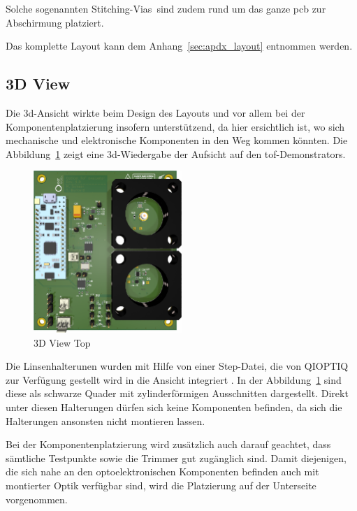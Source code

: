 Solche sogenannten \dq Stitching-Vias\dq\ sind zudem rund um das ganze \acrshort{pcb} zur Abschirmung platziert.

Das komplette Layout kann dem Anhang~\ref{sec:apdx_layout} entnommen werden.

\pagebreak

\subsection{3D View}
Die \acrshort{3d}-Ansicht wirkte beim Design des Layouts und vor allem bei der Komponentenplatzierung insofern unterstützend, da hier
ersichtlich ist, wo sich mechanische und elektronische Komponenten in den Weg kommen könnten. Die Abbildung~\ref{fig:3d_top}
zeigt eine \acrshort{3d}-Wiedergabe der Aufsicht auf den \acrshort{tof}-Demonstrators.

\begin{figure}[H]
    \centering
    \includegraphics[width=0.5\textwidth]{graphics/3d_top.png}
    \caption{3D View Top}\label{fig:3d_top}
\end{figure}

Die Linsenhalterunen wurden mit Hilfe von einer Step-Datei, die von QIOPTIQ zur Verfügung gestellt wird in die Ansicht
integriert \cite{qioptiq2024g061041000_shoppage}. In der Abbildung~\ref{fig:3d_top} sind diese als schwarze Quader mit zylinderförmigen Ausschnitten dargestellt.
Direkt unter diesen Halterungen dürfen sich keine Komponenten befinden, da sich die Halterungen ansonsten nicht montieren
lassen.

Bei der Komponentenplatzierung wird zusätzlich auch darauf geachtet, dass sämtliche Testpunkte sowie die Trimmer gut
zugänglich sind. Damit diejenigen, die sich nahe an den optoelektronischen Komponenten befinden auch mit montierter Optik
verfügbar sind, wird die Platzierung auf der Unterseite vorgenommen.


